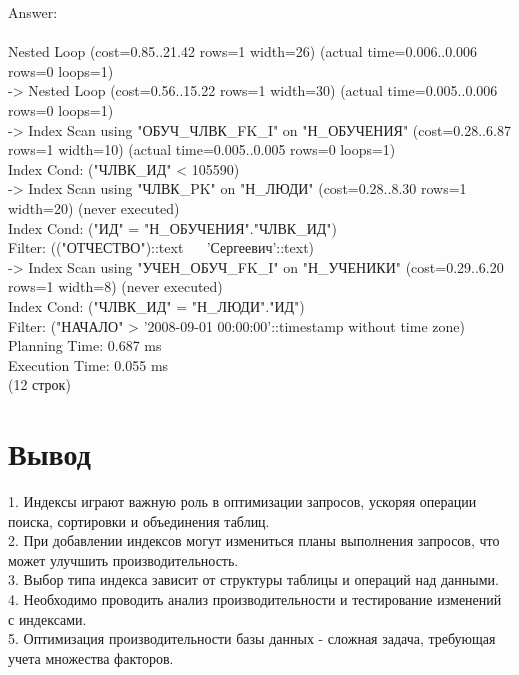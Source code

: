 \documentclass{article}
\begin{document}
 Answer:\\
 \\Nested Loop  (cost=0.85..21.42 rows=1 width=26) (actual time=0.006..0.006 rows=0 loops=1)
 \\->  Nested Loop  (cost=0.56..15.22 rows=1 width=30) (actual time=0.005..0.006 rows=0 loops=1)
       \\->  Index Scan using "ОБУЧ\_ЧЛВК\_FK\_I" on "Н\_ОБУЧЕНИЯ"  (cost=0.28..6.87 rows=1 width=10) (actual time=0.005..0.005 rows=0 loops=1)
       \\      Index Cond: ("ЧЛВК\_ИД" < 105590)
     \\  ->  Index Scan using "ЧЛВК\_PK" on "Н\_ЛЮДИ"  (cost=0.28..8.30 rows=1 width=20) (never executed)
      \\       Index Cond: ("ИД" = "Н\_ОБУЧЕНИЯ"."ЧЛВК\_ИД")
      \\       Filter: (("ОТЧЕСТВО")::text ~~ 'Сергеевич'::text)
\\ ->  Index Scan using "УЧЕН\_ОБУЧ\_FK\_I" on "Н\_УЧЕНИКИ"  (cost=0.29..6.20 rows=1 width=8) (never executed)
  \\     Index Cond: ("ЧЛВК\_ИД" = "Н\_ЛЮДИ"."ИД")
  \\     Filter: ("НАЧАЛО" > '2008-09-01 00:00:00'::timestamp without time zone)
\\Planning Time: 0.687 ms
\\Execution Time: 0.055 ms
\\(12 строк)
\section{Вывод}
1. Индексы играют важную роль в оптимизации запросов, ускоряя операции поиска, сортировки и объединения таблиц.
\\2. При добавлении индексов могут измениться планы выполнения запросов, что может улучшить производительность.
\\3. Выбор типа индекса зависит от структуры таблицы и операций над данными.
\\4. Необходимо проводить анализ производительности и тестирование изменений с индексами.
\\5. Оптимизация производительности базы данных - сложная задача, требующая учета множества факторов.
\end{document}
